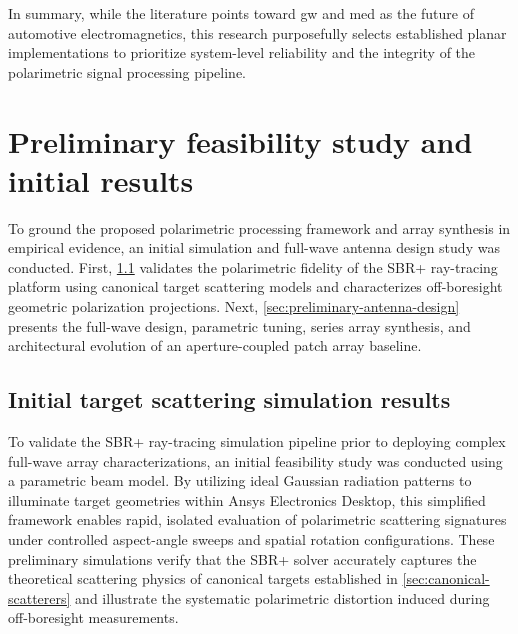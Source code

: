 \begin{itemize}
\end{itemize}

In summary, while the literature points toward \gls{gw} and \gls{med} as the future of automotive electromagnetics, this research purposefully selects established planar implementations to prioritize system-level reliability and the integrity of the polarimetric signal processing pipeline.


\section{Preliminary feasibility study and initial results}
\label{sec:feasibility-study}

To ground the proposed polarimetric processing framework and array synthesis in empirical evidence, an initial simulation and full-wave antenna design study was conducted.
First, \cref{sec:initial-scattering-results} validates the polarimetric fidelity of the SBR+ ray-tracing platform using canonical target scattering models and characterizes off-boresight geometric polarization projections.
Next, \cref{sec:preliminary-antenna-design} presents the full-wave design, parametric tuning, series array synthesis, and architectural evolution of an aperture-coupled patch array baseline.


\subsection{Initial target scattering simulation results}
\label{sec:initial-scattering-results}

To validate the SBR+ ray-tracing simulation pipeline prior to deploying complex full-wave array characterizations, an initial feasibility study was conducted using a parametric beam model.
By utilizing ideal Gaussian radiation patterns to illuminate target geometries within Ansys Electronics Desktop, this simplified framework enables rapid, isolated evaluation of polarimetric scattering signatures under controlled aspect-angle sweeps and spatial rotation configurations.
These preliminary simulations verify that the SBR+ solver accurately captures the theoretical scattering physics of canonical targets established in \cref{sec:canonical-scatterers} and illustrate the systematic polarimetric distortion induced during off-boresight measurements.

